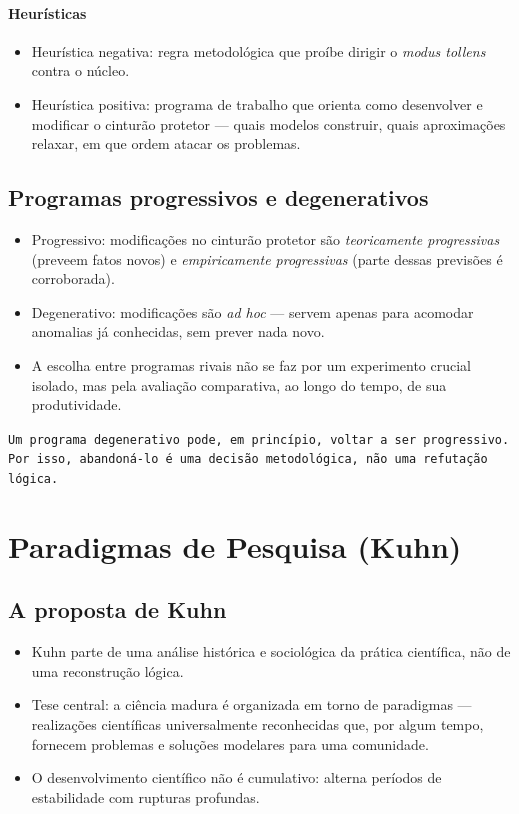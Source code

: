 \documentclass[9pt,a4paper]{extarticle}
\newcommand{\impt}[1]{\textcolor{important}{#1}}
\newcommand{\ntc}[1]{\textcolor{notice}{#1}}
\begin{document}
\paragraph{Heurísticas}
\begin{itemize}
    \item \ntc{Heurística negativa}: regra metodológica que proíbe dirigir o \textit{modus tollens} contra o núcleo.
    \item \ntc{Heurística positiva}: programa de trabalho que orienta como desenvolver e modificar o cinturão protetor --- quais modelos construir, quais aproximações relaxar, em que ordem atacar os problemas.
\end{itemize}

\subsection{Programas progressivos e degenerativos}

\begin{itemize}
    \item \impt{Progressivo}: modificações no cinturão protetor são \emph{teoricamente progressivas} (preveem fatos novos) e \emph{empiricamente progressivas} (parte dessas previsões é corroborada).
    \item \impt{Degenerativo}: modificações são \textit{ad hoc} --- servem apenas para acomodar anomalias já conhecidas, sem prever nada novo.
    \item A escolha entre programas rivais não se faz por um experimento crucial isolado, mas pela \ntc{avaliação comparativa, ao longo do tempo}, de sua produtividade.
\end{itemize}

\texttt{Um programa degenerativo pode, em princípio, voltar a ser progressivo. Por isso, abandoná-lo é uma decisão metodológica, não uma refutação lógica.}

\section{Paradigmas de Pesquisa (Kuhn)}

\subsection{A proposta de Kuhn}

\begin{itemize}
    \item Kuhn parte de uma análise \impt{histórica e sociológica} da prática científica, não de uma reconstrução lógica.
    \item \ntc{Tese central}: a ciência madura é organizada em torno de \impt{paradigmas} --- realizações científicas universalmente reconhecidas que, por algum tempo, fornecem problemas e soluções modelares para uma comunidade.
    \item O desenvolvimento científico não é cumulativo: alterna períodos de estabilidade com rupturas profundas.
\end{itemize}
\end{document}
